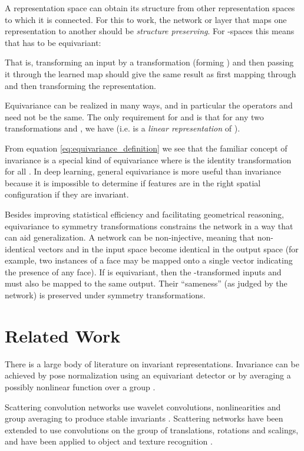 \documentclass{article}
\begin{document}
A representation space can obtain its structure from other representation spaces to which it is connected.
For this to work, the network or layer  that maps one representation to another should be \emph{structure preserving}. For -spaces this means that  has to be equivariant:

That is, transforming an input  by a transformation  (forming ) and then passing it through the learned map  should give the same result as first mapping  through  and then transforming the representation.

Equivariance can be realized in many ways, and in particular the operators  and  need not be the same.
The only requirement for  and  is that for any two transformations  and ,
 we have  (i.e.  is a \emph{linear representation} of ).

From equation \ref{eq:equivariance_definition} we see that the familiar concept of invariance is a special kind of equivariance where  is the identity transformation for all .
In deep learning, general equivariance is more useful than invariance because it is impossible to determine if features are in the right spatial configuration if they are invariant.

Besides improving statistical efficiency and facilitating geometrical reasoning, equivariance to symmetry transformations constrains the network in a way that can aid generalization.
A network  can be non-injective, meaning that non-identical vectors  and  in the input space become identical in the output space (for example, two instances of a face may be mapped onto a single vector indicating the presence of any face).
If  is equivariant, then the -transformed inputs  and  must also be mapped to the same output.
Their ``sameness'' (as judged by the network) is preserved under symmetry transformations.


\section{Related Work}
\label{sec:related_work}

There is a large body of literature on invariant representations.
Invariance can be achieved by pose normalization using an equivariant detector \cite{Lowe2004, Jaderberg2015} or by averaging a possibly nonlinear function over a group \cite{Reisert2008, Skibbe2013, Manay2006, Kondor2007}.

Scattering convolution networks use wavelet convolutions, nonlinearities and group averaging to produce stable invariants \cite{Bruna2013_TPAMI}.
Scattering networks have been extended to use convolutions on the group of translations, rotations and scalings, and have been applied to object and texture recognition \cite{Sifre2013, Oyallon2015}.
\end{document}
